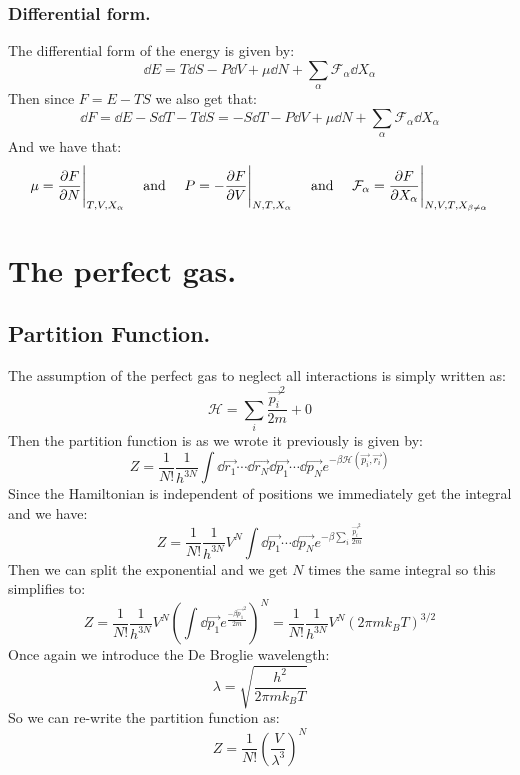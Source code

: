 \documentclass[10pt,a4paper]{book}
\begin{document}
\subsubsection{Differential form.}
The differential form of the energy is given by:
\[
\dd E = T \dd S - P\dd V + \mu \dd N + \sum_\alpha \mathcal{F}_\alpha \dd X_\alpha
\]
Then since $F = E - TS$ we also get that:
\[
\dd F = \dd E - S \dd T - T \dd S = - S \dd T - P \dd V + \mu \dd N + \sum_{\alpha} \mathcal{F}_\alpha \dd X_\alpha
\]
And we have that:
\[
\mu = \pdv{F}{N}\Bigg|_{T, V, X_\alpha} \quad \text{ and } \quad P = -\pdv{F}{V}\Bigg|_{N,T, X_\alpha} \quad \text{ and } \quad \mathcal{F}_\alpha = \pdv{F}{X_\alpha} \Bigg|_{N, V, T, X_{\beta \neq \alpha}}
\]

\section{The perfect gas.}
\subsection{Partition Function.}
The assumption of the perfect gas to neglect all interactions is simply written as:
\[
\mathcal{H} = \sum_i \frac{\vec{p_i}^2}{2m} + 0
\]
Then the partition function is as we wrote it previously is given by:
\[
Z = \frac{1}{N!} \frac{1}{h^{3N}} \int \dd \vec{r_1} \cdots \dd \vec{r_N} \dd \vec{p_1} \cdots \dd \vec{p_N} e^{-\beta \mathcal{H}({\vec{p_i}, \vec{r_i}})}
\]
Since the Hamiltonian is independent of positions we immediately get the integral and we have:
\[
Z = \frac{1}{N!} \frac{1}{h^{3N}} V^N \int \dd \vec{p_1}\cdots \dd \vec{p_N} e^{-\beta\sum_i \frac{\vec{p_i}^2}{2m}}
\]
Then we can split the exponential and we get $N$ times the same integral so this simplifies to:
\[
Z = \frac{1}{N!} \frac{1}{h^{3N}} V^N \left( \int \dd \vec{p_1} e^{\frac{-\beta \vec{p_1}^2}{2m}} \right)^N = \frac{1}{N!} \frac{1}{h^{3N}} V^N \left(2\pi m k_B T \right)^{3/2}
\]
Once again we introduce the De Broglie wavelength:
\[
\lambda = \sqrt{\frac{h^2}{2\pi m k_B T}}
\]
So we can re-write the partition function as:
\[
Z = \frac{1}{N!} \left(\frac{V}{\lambda^3}\right)^N
\]
\end{document}
